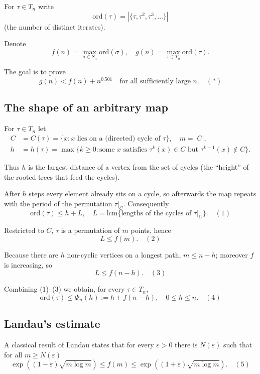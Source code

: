 \documentclass[12pt,a4paper]{article}
\theoremstyle{definition}
\begin{document}
        For $\tau \in T_n$ write
        $$\text{ord}(\tau) = |\{\tau, \tau^2, \tau^3, \ldots\}|$$
        (the number of distinct iterates).

        Denote
        $$f(n) = \max_{\sigma \in S_n} \text{ord}(\sigma), \quad g(n) = \max_{\tau \in T_n} \text{ord}(\tau).$$

        The goal is to prove
        $$g(n) < f(n) + n^{0.501} \quad \text{for all sufficiently large } n. \quad (*)$$

        \subsection*{The shape of an arbitrary map}

        For $\tau \in T_n$ let
        \begin{align}
            C &= C(\tau) = \{x : x \text{ lies on a (directed) cycle of } \tau\}, \quad m = |C|, \\
            h &= h(\tau) = \max\{k \geq 0 : \text{some } x \text{ satisfies } \tau^k(x) \in C \text{ but } \tau^{k-1}(x) \notin C\}.
        \end{align}

        Thus $h$ is the largest distance of a vertex from the set of cycles (the ``height'' of the rooted trees that feed the cycles).

        After $h$ steps every element already sits on a cycle, so afterwards the map repeats with the period of the permutation $\tau|_C$. Consequently
        $$\text{ord}(\tau) \leq h + L, \quad L = \text{lcm}\{\text{lengths of the cycles of } \tau|_C\}. \quad (1)$$

        Restricted to $C$, $\tau$ is a permutation of $m$ points, hence
        $$L \leq f(m). \quad (2)$$

        Because there are $h$ non-cyclic vertices on a longest path, $m \leq n - h$; moreover $f$ is increasing, so
        $$L \leq f(n - h). \quad (3)$$

        Combining (1)--(3) we obtain, for every $\tau \in T_n$,
        $$\text{ord}(\tau) \leq \Phi_n(h) := h + f(n - h), \quad 0 \leq h \leq n. \quad (4)$$

        \subsection*{Landau's estimate}

        A classical result of Landau states that for every $\varepsilon > 0$ there is $N(\varepsilon)$ such that for all $m \geq N(\varepsilon)$
        $$\exp((1 - \varepsilon)\sqrt{m \log m}) \leq f(m) \leq \exp((1 + \varepsilon)\sqrt{m \log m}). \quad (5)$$
\end{document}
